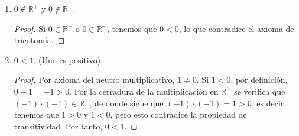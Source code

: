\documentclass[11pt]{article}
\newcommand{\R}{\mathbb{R}}
\newcommand{\bfit}[1]{\textbf{\textit{#1}}}
\let\set\Set
\begin{document}
\begin{enumerate}[label=\alph*)]
%
    \item $0\notin \R^+$ y $0\notin \R^-$.
    \vspace{-1em}\begin{proof} 
    Si $0\in \R^+$ o $0\in \R^-$, tenemos que $0<0$, lo que contradice el axioma de tricotomía.
    \end{proof} \vspace{-1em}
%
%
    \item $0<1$. (Uno es positivo).
    \vspace{-1em}\begin{proof} 
        Por axioma del neutro multiplicativo, $1\neq 0$. Si $1<0$, por definición, $0-1=-1>0$. Por la cerradura de la multiplicación en $\R^+$ se verifica que $(-1) \cdot (-1) \in \R^+$, de donde sigue que $(-1) \cdot (-1) = 1>0$, es decir, tenemos que $1>0$ y $1<0$, pero esto contradice la propiedad de transitividad. Por tanto, $0<1$.
    \end{proof} \vspace{-1em}


\end{enumerate}
\end{document}
